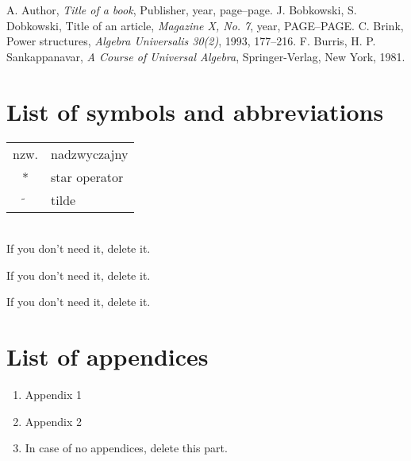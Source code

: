 \documentclass[a4paper,11pt,twoside]{report}
\theoremstyle{definition}
\begin{document}
\null\thispagestyle{empty}\newpage
\pagestyle{fancy}
\setcounter{page}{11}









\begin{thebibliography}{20} %

   A. Author, \emph{Title of a book}, Publisher, year, page--page.
   J. Bobkowski, S. Dobkowski, Title of an article, \emph{Magazine X, No. 7}, year, PAGE--PAGE.
   C. Brink, Power structures, \emph{Algebra Universalis 30(2)}, 1993, 177--216.
   F. Burris, H. P. Sankappanavar, \emph{A Course of Universal Algebra}, Springer-Verlag, New York, 1981.
\end{thebibliography}
\thispagestyle{empty}



\chapter*{List of symbols and abbreviations}

\begin{tabular}{cl}
  nzw.           & nadzwyczajny  \\
  *              & star operator \\
  $\widetilde{}$ & tilde
\end{tabular}
\\
If you don't need it, delete it.
\thispagestyle{empty}


\listoffigures
\thispagestyle{empty}
If you don't need it, delete it.


\renewcommand{\listtablename}{Spis tabel}
\listoftables
\thispagestyle{empty}
If you don't need it, delete it.

\chapter*{List of appendices}
\begin{enumerate}
  \item Appendix 1
  \item Appendix 2
  \item In case of no appendices, delete this part.
\end{enumerate}
\thispagestyle{empty}
\end{document}
